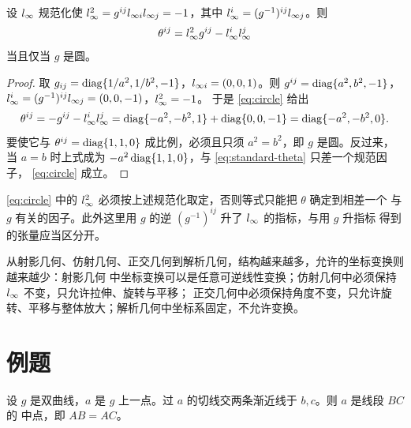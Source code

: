 \begin{proposition}[圆]
设 $l_{\infty}$ 规范化使 $l_{\infty}^2=g^{ij}l_{\infty i}l_{\infty j}=-1$，其中
$l_{\infty}^i=(g^{-1})^{ij}l_{\infty j}$。则
\begin{equation}
\theta^{ij}=l_{\infty}^2g^{ij}-l_{\infty}^il_{\infty}^j
\label{eq:circle}
\end{equation}
当且仅当 $g$ 是圆。
\end{proposition}

\begin{proof}
取 $g_{ij}=\operatorname{diag}\{1/a^2,1/b^2,-1\}$，$l_{\infty i}=(0,0,1)$。则
$g^{ij}=\operatorname{diag}\{a^2,b^2,-1\}$，$l_{\infty}^i=(g^{-1})^{ij}l_{\infty j}=(0,0,-1)$，$l_{\infty}^2=-1$。
于是 \eqref{eq:circle} 给出
\[
\theta^{ij}=-g^{ij}-l_{\infty}^il_{\infty}^j
=\operatorname{diag}\{-a^2,-b^2,1\}+\operatorname{diag}\{0,0,-1\}
=\operatorname{diag}\{-a^2,-b^2,0\}.
\]
要使它与 $\theta^{ij}=\operatorname{diag}\{1,1,0\}$ 成比例，必须且只须 $a^2=b^2$，即 $g$ 是圆。反过来，
当 $a=b$ 时上式成为 $-a^2\operatorname{diag}\{1,1,0\}$，与 \eqref{eq:standard-theta} 只差一个规范因子，
\eqref{eq:circle} 成立。
\end{proof}

\begin{remark}
\eqref{eq:circle} 中的 $l_{\infty}^2$ 必须按上述规范化取定，否则等式只能把 $\theta$ 确定到相差一个
与 $g$ 有关的因子。此外这里用 $g$ 的逆 $(g^{-1})^{ij}$ 升了 $l_{\infty}$ 的指标，与用 $g$ 升指标
得到的张量应当区分开。
\end{remark}

从射影几何、仿射几何、正交几何到解析几何，结构越来越多，允许的坐标变换则越来越少：射影几何
中坐标变换可以是任意可逆线性变换；仿射几何中必须保持 $l_{\infty}$ 不变，只允许拉伸、旋转与平移；
正交几何中必须保持角度不变，只允许旋转、平移与整体放大；解析几何中坐标系固定，不允许变换。

\section{例题}

\begin{example}[双曲线切线被渐近线截得的线段]
设 $g$ 是双曲线，$a$ 是 $g$ 上一点。过 $a$ 的切线交两条渐近线于 $b,c$。则 $a$ 是线段 $BC$ 的
中点，即 $AB=AC$。
\end{example}


